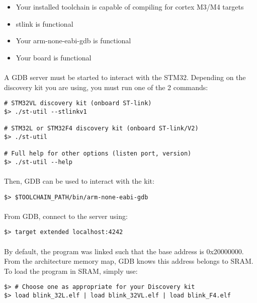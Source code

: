 \documentclass[a4paper, 11pt]{article}
\begin{document}
\begin{itemize}
\item Your installed toolchain is capable of compiling for cortex M3/M4 targets
\item stlink is functional
\item Your arm-none-eabi-gdb is functional
\item Your board is functional
\end{itemize}

\paragraph{}
A GDB server must be started to interact with the STM32. Depending on the discovery kit you
are using, you must run one of the 2 commands:\\
\begin{small}
\begin{lstlisting}[frame=tb]
# STM32VL discovery kit (onboard ST-link)
$> ./st-util --stlinkv1

# STM32L or STM32F4 discovery kit (onboard ST-link/V2)
$> ./st-util 

# Full help for other options (listen port, version)
$> ./st-util --help
\end{lstlisting}
\end{small}

\paragraph{}
Then, GDB can be used to interact with the kit:\\
\begin{small}
\begin{lstlisting}[frame=tb]
$> $TOOLCHAIN_PATH/bin/arm-none-eabi-gdb
\end{lstlisting}
\end{small}

\paragraph{}
From GDB, connect to the server using:\\
\begin{small}
\begin{lstlisting}[frame=tb]
$> target extended localhost:4242
\end{lstlisting}
\end{small}

\paragraph{}
By default, the program was linked such that the base address is 0x20000000. From the architecture
memory map, GDB knows this address belongs to SRAM. To load the program in SRAM, simply use:\\
\begin{small}
\begin{lstlisting}[frame=tb]
$> # Choose one as appropriate for your Discovery kit
$> load blink_32L.elf | load blink_32VL.elf | load blink_F4.elf
\end{lstlisting}
\end{small}
\end{document}
